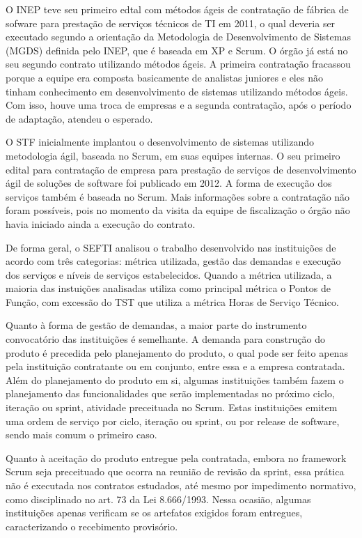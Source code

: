 O INEP teve seu primeiro edtal com métodos ágeis de contratação de fábrica de sofware para prestação de serviços técnicos de TI em 2011, o qual deveria ser executado segundo a orientação da Metodologia de Desenvolvimento de Sistemas (MGDS) definida pelo INEP, que é baseada em XP e Scrum. O órgão já está no seu segundo contrato utilizando métodos ágeis. A primeira contratação fracassou porque a equipe era composta basicamente de analistas juniores e eles não tinham conhecimento em desenvolvimento de sistemas utilizando métodos ágeis. Com isso, houve uma troca de empresas e a segunda contratação, após o período de adaptação, atendeu o esperado.

O STF inicialmente implantou o desenvolvimento de sistemas utilizando metodologia ágil, baseada no Scrum, em suas equipes internas. O seu primeiro edital para contratação de empresa para prestação de serviços de desenvolvimento ágil de soluções de software foi publicado em 2012. A forma de execução dos serviços também é baseada no Scrum. Mais informações sobre a contratação não foram possíveis, pois no momento da visita da equipe de fiscalização o órgão não havia iniciado ainda a execução do contrato. 

De forma geral, o SEFTI analisou o trabalho desenvolvido nas instituições de acordo com três categorias: métrica utilizada, gestão das demandas e execução dos serviços e níveis de serviços estabelecidos. Quando a métrica utilizada, a maioria das instuições analisadas utiliza como principal métrica o Pontos de Função, com excessão do TST que utiliza a métrica Horas de Serviço Técnico. 

Quanto à forma de gestão de demandas, a maior parte do instrumento convocatório das instituições é semelhante. A demanda para construção do produto é precedida pelo planejamento do produto, o qual pode ser feito apenas pela instituição contratante ou em conjunto, entre essa e a empresa contratada. Além do planejamento do produto em si, algumas instituições também fazem o planejamento das funcionalidades que serão implementadas no próximo ciclo, iteração ou sprint, atividade preceituada no Scrum. Estas instituições emitem uma ordem de serviço por ciclo, iteração ou sprint, ou por release de software, sendo mais comum o primeiro caso. 

Quanto à aceitação do produto entregue pela contratada, embora no framework Scrum seja preceituado que ocorra na reunião de revisão da sprint, essa prática não é executada nos contratos estudados, até mesmo por impedimento normativo, como disciplinado no art. 73 da Lei 8.666/1993. Nessa ocasião, algumas instituições apenas verificam se os artefatos exigidos foram entregues, caracterizando o recebimento provisório. 

